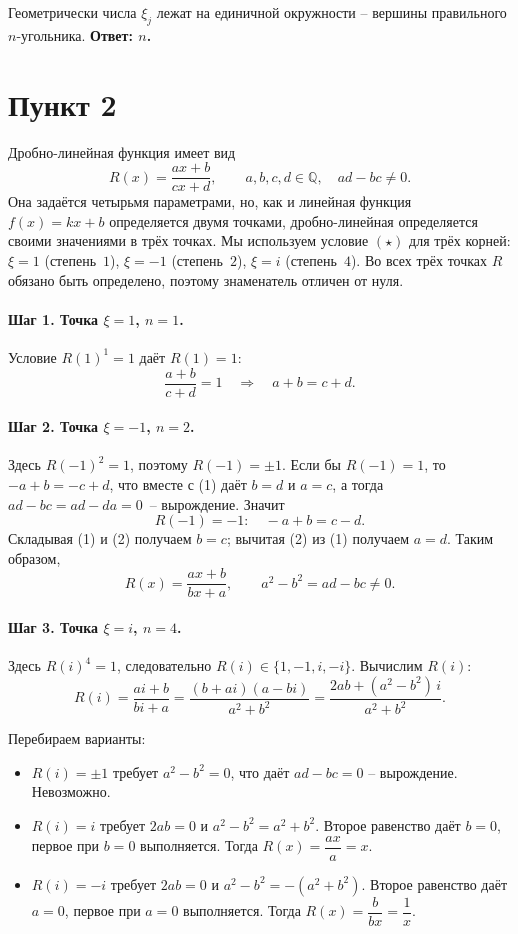 \documentclass[12pt,a4paper]{article}
\begin{document}
Геометрически числа $\xi_j$ лежат на единичной окружности -- вершины
правильного $n$-угольника. \textbf{Ответ: $n$.}

\section{Пункт 2}

Дробно-линейная функция имеет вид
\[
  R(x)=\frac{ax+b}{cx+d},\qquad a,b,c,d\in\mathbb Q,\quad ad-bc\ne0.
\]
Она задаётся четырьмя параметрами, но, как и линейная функция
$f(x)=kx+b$ определяется двумя точками, дробно-линейная определяется
своими значениями в трёх точках. Мы используем условие $(\star)$ для трёх
корней: $\xi=1$ (степень~$1$), $\xi=-1$ (степень~$2$), $\xi=i$
(степень~$4$). Во всех трёх точках $R$ обязано быть определено, поэтому
знаменатель отличен от нуля.

\paragraph{Шаг 1. Точка $\xi=1$, $n=1$.}
Условие $R(1)^{1}=1$ даёт $R(1)=1$:
\[
  \frac{a+b}{c+d}=1 \quad\Rightarrow\quad a+b = c+d. \tag{1}
\]

\paragraph{Шаг 2. Точка $\xi=-1$, $n=2$.}
Здесь $R(-1)^{2}=1$, поэтому $R(-1)=\pm 1$. Если бы $R(-1)=1$, то
$-a+b = -c+d$, что вместе с (1) даёт $b=d$ и $a=c$, а тогда
$ad-bc = ad-da = 0$~-- вырождение. Значит
\[
  R(-1)=-1:\quad -a+b = c-d. \tag{2}
\]
Складывая (1) и (2) получаем $b=c$; вычитая (2) из (1) получаем $a=d$.
Таким образом,
\[
  R(x)=\frac{ax+b}{bx+a},\qquad a^{2}-b^{2}=ad-bc\ne0.
\]

\paragraph{Шаг 3. Точка $\xi=i$, $n=4$.}
Здесь $R(i)^{4}=1$, следовательно $R(i)\in\{1,-1,i,-i\}$. Вычислим $R(i)$:
\[
  R(i)=\frac{ai+b}{bi+a}
      =\frac{(b+ai)(a-bi)}{a^{2}+b^{2}}
      =\frac{2ab+(a^{2}-b^{2})\,i}{a^{2}+b^{2}} .
\]

Перебираем варианты:
\begin{itemize}
  \item $R(i)=\pm1$ требует $a^{2}-b^{2}=0$, что даёт $ad-bc=0$ --
        вырождение. Невозможно.
  \item $R(i)=i$ требует $2ab=0$ и $a^{2}-b^{2}=a^{2}+b^{2}$. Второе
        равенство даёт $b=0$, первое при $b=0$ выполняется. Тогда
        $R(x)=\dfrac{ax}{a}=x$.
  \item $R(i)=-i$ требует $2ab=0$ и $a^{2}-b^{2}=-(a^{2}+b^{2})$. Второе
        равенство даёт $a=0$, первое при $a=0$ выполняется. Тогда
        $R(x)=\dfrac{b}{bx}=\dfrac1x$.
\end{itemize}
\end{document}
